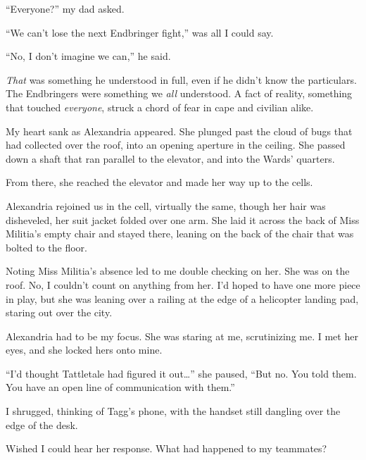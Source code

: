 ``Everyone?'' my dad asked.



``We can't lose the next Endbringer fight,'' was all I could say.



``No, I don't imagine we can,'' he said.



\emph{That} was something he understood in full, even if he didn't know the particulars.  The Endbringers were something we \emph{all} understood.  A fact of reality, something that touched \emph{everyone}, struck a chord of fear in cape and civilian alike.



My heart sank as Alexandria appeared.  She plunged past the cloud of bugs that had collected over the roof, into an opening aperture in the ceiling.  She passed down a shaft that ran parallel to the elevator, and into the Wards' quarters.



From there, she reached the elevator and made her way up to the cells.



Alexandria rejoined us in the cell, virtually the same, though her hair was disheveled, her suit jacket folded over one arm.  She laid it across the back of Miss Militia's empty chair and stayed there, leaning on the back of the chair that was bolted to the floor.



Noting Miss Militia's absence led to me double checking on her.  She was on the roof.  No, I couldn't count on anything from her.  I'd hoped to have one more piece in play, but she was leaning over a railing at the edge of a helicopter landing pad, staring out over the city.



Alexandria had to be my focus.  She was staring at me, scrutinizing me.  I met her eyes, and she locked hers onto mine.



``I'd thought Tattletale had figured it out\ldots'' she paused, ``But no.  You told them.  You have an open line of communication with them.''



I shrugged, thinking of Tagg's phone, with the handset still dangling over the edge of the desk.



Wished I could hear her response.  What had happened to my teammates?



